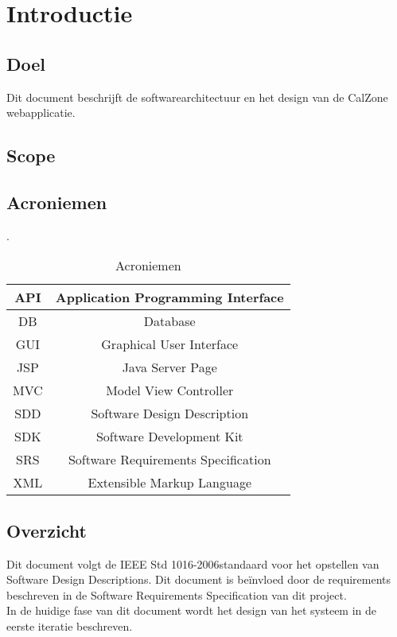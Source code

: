 \chapter{Introductie}

\section{Doel}
Dit document beschrijft de softwarearchitectuur en het design van de CalZone webapplicatie.
\section{Scope}

\section{Acroniemen}.

\begin{table}[H]
	\begin{tabular}{c|c}
	\hline
	API	& Application Programming Interface\\
	\hline
	DB	& Database\\
	\hline
	GUI	& Graphical User Interface\\
	\hline
	JSP & Java Server Page\\
	\hline
	MVC & Model View Controller\\ 
	\hline
	SDD	& Software Design Description\\
	\hline
	SDK	& Software Development Kit\\
	\hline
	SRS	& Software Requirements Specification\\
	\hline
	XML & Extensible Markup Language\\
	\hline
	\end{tabular}
	\caption{Acroniemen}
	\label{tab:Acroniemen}
\end{table}

\section{Overzicht}
Dit document volgt de IEEE Std 1016-2006\texttrademark \space standaard voor het opstellen van Software Design Descriptions. 
Dit document is be\"{i}nvloed door de requirements beschreven in de Software Requirements Specification van dit project.\\ In de huidige fase van dit document wordt het design van het systeem in de eerste iteratie beschreven. 